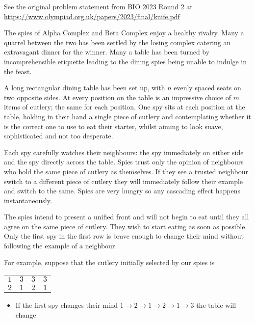 \begin{center}\small{
  See the original problem statement from BIO 2023 Round 2 at
  \url{https://www.olympiad.org.uk/papers/2023/final/knife.pdf}
}\end{center}

The spies of Alpha Complex and Beta Complex enjoy a healthy rivalry. Many a quarrel between the two has been settled by the losing complex catering an extravagant dinner for the winner. Many a table has been turned by incomprehensible etiquette leading to the dining spies being unable to indulge in the feast.

A long rectangular dining table has been set up, with $n$ evenly spaced seats on two opposite sides. At every position on the table is an impressive choice of $m$ items of cutlery; the same for each position. One spy sits at each position at the table, holding in their hand a single piece of cutlery and contemplating whether it is the correct one to use to eat their starter, whilst aiming to look suave, sophisticated and not too desperate.

Each spy carefully watches their neighbours: the spy immediately on either side and the spy directly across the table. Spies trust only the opinion of neighbours who hold the same piece of cutlery as themselves. If they see a trusted neighbour switch to a different piece of cutlery they will immediately follow their example and switch to the same. Spies are very hungry so any cascading effect happens instantaneously.

The spies intend to present a unified front and will not begin to eat until they all agree on the same piece of cutlery. They wish to start eating as soon as possible. Only the first spy in the first row is brave enough to change their mind without following the example of a neighbour.

For example, suppose that the cutlery initially selected by our spies is
\begin{center}
  \begin{tabular}{llll}
    $1$ & $3$ & $3$ & $3$ \\
    $2$ & $1$ & $2$ & $1$
  \end{tabular}
\end{center}

\begin{itemize}
  \item If the first spy changes their mind $1\rightarrow2\rightarrow1\rightarrow2\rightarrow1\rightarrow3$ the table will change
\end{itemize}

